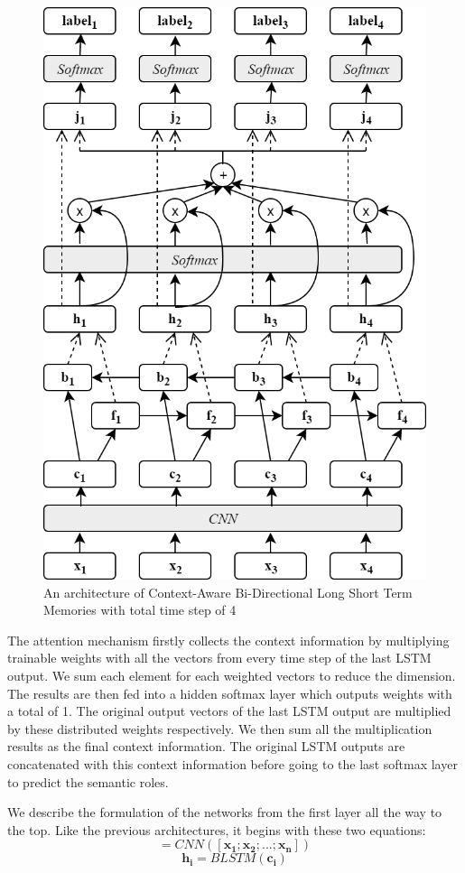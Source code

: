 \begin{figure}
	\centering
	\includegraphics[width=0.75\linewidth]{images/cabilstm}
	\caption{An architecture of Context-Aware Bi-Directional Long Short Term Memories with total time step of 4}
	\label{fig:cabilstm}
\end{figure}

The attention mechanism firstly collects the context information by multiplying trainable weights with all the vectors from every time step of the last LSTM output. We sum each element for each weighted vectors to reduce the dimension. The results are then fed into a hidden softmax layer which outputs weights with a total of 1. The original output vectors of the last LSTM output are multiplied by these distributed weights respectively. We then sum all the multiplication results as the final context information. The original LSTM outputs are concatenated with this context information before going to the last softmax layer to predict the semantic roles. 

We describe the formulation of the networks from the first layer all the way to the top. Like the previous architectures, it begins with these two equations:
\begin{equation}
[\mathbf{c_{1}}; \mathbf{c_{2}}; ...; \mathbf{c_{n}}] = CNN([\mathbf{x_{1}}; \mathbf{x_{2}}; ...; \mathbf{x_{n}}])
\end{equation}
\begin{equation}
\mathbf{h_{i}} = BLSTM(\mathbf{c_{i}})
\end{equation}

